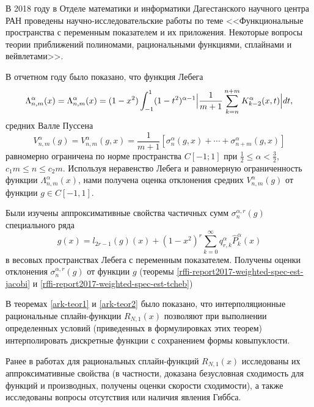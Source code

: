 \Conclusion

В 2018 году в Отделе математики и информатики Дагестанского научного центра РАН проведены научно-исследовательские работы по теме
<<Функциональные пространства с переменным показателем и их приложения. Некоторые вопросы теории приближений полиномами, рациональными функциями, сплайнами и вейвлетами>>.

В отчетном году было показано, что функция Лебега
$$\Lambda_{n,m}^\alpha(x)=\Lambda_{n,m}^\alpha(x)=
(1-x^2)\int_{-1}^{1}(1-t^2)^{\alpha-1}\Bigl|
\frac{1}{m+1}\sum\limits_{k=n}^{n+m}K^\alpha_{k-2}(x,t)
\Bigr|dt,$$
средних Валле Пуссена
$$V_{n,m}^\alpha(g)=V_{n,m}^\alpha(g,x)=\frac{1}{m+1}[\sigma_n^\alpha(g,x)+\cdots+\sigma_{n+m}^\alpha(g,x)]$$
равномерно ограничена по норме пространства $C[-1;1]$ при $\frac12\le\alpha<\frac32$, $c_1m \le n\le c_2m$. Используя неравенство Лебега и равномерную ограниченность функции $\Lambda_{n,m}^\alpha(x)$, нами получена оценка отклонения средних $V_{n,m}^\alpha(g)$  от  функции $g\in C[-1,1]$.


Были изучены аппроксимативные свойства частичных сумм $\sigma_{n}^{\alpha,r}(g)$ специального ряда
$$g(x)=l_{2r-1}(g)(x)+(1-x^2)^r\sum_{k=0}^\infty q_{r,k}^\alpha\hat P_k^\alpha(x)$$ в весовых пространствах Лебега с переменным показателем. Получены оценки отклонения $\sigma_{n}^{\alpha,r}(g)$ от функции $g$ (теоремы \ref{rffi-report2017-weighted-spec-est-jacobi} и \ref{rffi-report2017-weighted-spec-est-tcheb})





В теоремах \ref{ark-teor1} и \ref{ark-teor2} было показано, что интерполяционные рациональные
сплайн-функции $R_{N,1}(x)$ позволяют при выполнении определенных условий
(приведенных в формулировках этих теорем) интерполировать дискретные функции
с сохранением формы ковыпуклости.

Ранее в работах \cite{ark-12,ark-13,ark-14,ark-15} для рациональных
сплайн-функций $R_{N,1}(x)$ исследованы их аппроксимативные свойства
 (в частности, доказана безусловная сходимость для функций и производных, получены
 оценки скорости сходимости), а также исследованы вопросы отсутствия или наличия
явления Гиббса.

